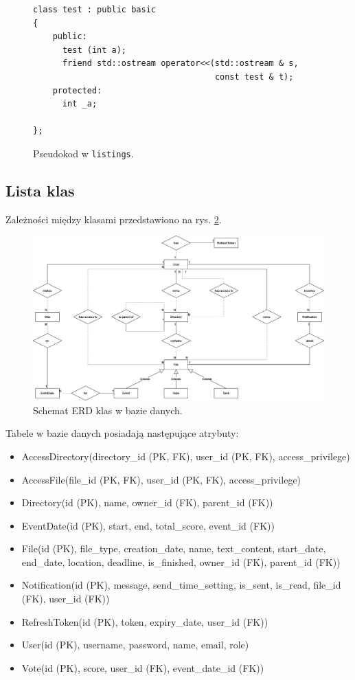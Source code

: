 \documentclass[a4paper,twoside,12pt]{book}
\begin{document}
\begin{figure}
\centering
\begin{lstlisting}
class test : public basic
{
    public:
      test (int a);
      friend std::ostream operator<<(std::ostream & s, 
                                     const test & t);
    protected:
      int _a;  
      
};
\end{lstlisting}
\caption{Pseudokod w \texttt{listings}.}
\label{fig:pseudokod:listings}
\end{figure}

\subsection{Lista klas}

Zależności między klasami przedstawiono na rys. \ref{fig:erd}.

\begin{figure}
\centering
\includegraphics{./ERD.png}
\caption{Schemat ERD klas w bazie danych.}
\label{fig:erd}
\end{figure}

Tabele w bazie danych posiadają następujące atrybuty:
\begin{itemize}
	\item AccessDirectory(directory_id (PK, FK), user_id (PK, FK), access_privilege)
	\item AccessFile(file_id (PK, FK), user_id (PK, FK), access_privilege)
	\item Directory(id (PK), name, owner_id (FK), parent_id (FK))
	\item EventDate(id (PK), start, end, total_score, event_id (FK))
	\item File(id (PK), file_type, creation_date, name, text_content, start_date, end_date, location, deadline, is_finished, owner_id (FK), parent_id (FK))
	\item Notification(id (PK), message, send_time_setting, is_sent, is_read, file_id (FK), user_id (FK))
	\item RefreshToken(id (PK), token, expiry_date, user_id (FK))
	\item User(id (PK), username, password, name, email, role)
	\item Vote(id (PK), score, user_id (FK), event_date_id (FK))
\end{itemize}
\end{document}
